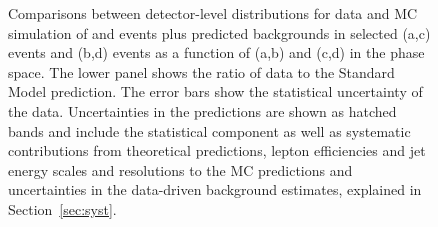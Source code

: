 \documentclass[cernpreprint,txfonts,UKenglish,texlive=2016]{\ATLASLATEXPATH atlasdoc}
\begin{document}
\begin{figure}
\begin{center}
	\caption {Comparisons between detector-level distributions for data and MC simulation of \Znunu{} and \Zll{} events plus 
          predicted backgrounds in selected (a,c)
          \ptmissjet{} events and (b,d) \lljet{} events as a function of (a,b) \mjj{}
          and (c,d) \dphijj{} in the \vbf{} phase space. 
         The lower panel shows the ratio of data to the Standard
         Model prediction.
         The error bars show the statistical uncertainty of the data.
          Uncertainties in the predictions are shown as hatched bands and include
           the statistical component as well as systematic contributions 
          from theoretical predictions, lepton efficiencies and jet energy scales
          and resolutions to the MC predictions and uncertainties in
          the data-driven background estimates, explained in Section~\ref{sec:syst}.   }
  \label{fig:mjj-dphi-datamc}
	\end{center}
\end{figure}
\end{document}
